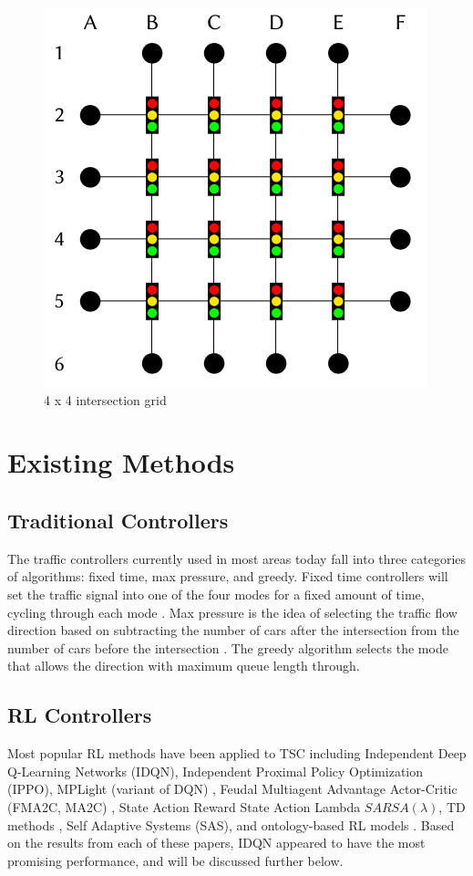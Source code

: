 \documentclass[letterpaper]{article} %
\begin{document}
\begin{figure}[htbp]
  \centering
  \includegraphics[width=0.6\linewidth]{4x4.png}
  \caption{4 x 4 intersection grid}
  \label{fig:intersection_grid}
\end{figure}

\section{Existing Methods}
\subsection{Traditional Controllers}
The traffic controllers currently used in most areas today fall into three categories of algorithms: fixed time, max pressure, and greedy.
Fixed time controllers will set the traffic signal into one of the four modes for a fixed amount of time, cycling through each mode \cite{ault2021reinforcement}.
Max pressure is the idea of selecting the traffic flow direction based on subtracting the number of cars after the intersection from the number of cars before the intersection \cite{Chen_Wei_Xu_Zheng_Yang_Xiong_Xu_Li_2020}.
The greedy algorithm selects the mode that allows the direction with maximum queue length through.

\subsection{RL Controllers}
Most popular RL methods have been applied to TSC including Independent Deep Q-Learning Networks (IDQN), Independent Proximal Policy Optimization (IPPO), MPLight (variant of DQN) \cite{Chen_Wei_Xu_Zheng_Yang_Xiong_Xu_Li_2020}, Feudal Multiagent Advantage Actor-Critic (FMA2C, MA2C) \cite{DBLP:journals/corr/abs-1903-04527}, State Action Reward State Action Lambda \(SARSA(\lambda)\), TD methods \cite{Reza2023}, Self Adaptive Systems (SAS), and ontology-based RL models \cite{Ghanadbashi2023}.
Based on the results from each of these papers, IDQN appeared to have the most promising performance, and will be discussed further below.
\end{document}
